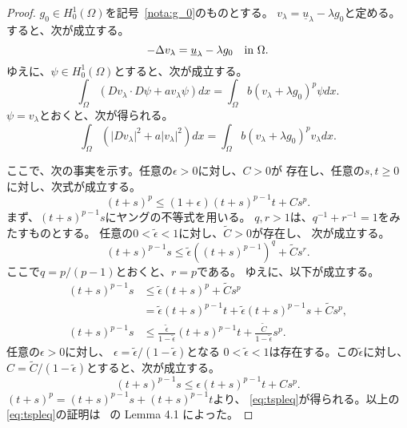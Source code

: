 \begin{proof}
 $g_0 \in H_0^1(\Omega)$を記号~\ref{nota:g_0}のものとする。
 $v_\lambda = \underline{u}_\lambda - \lambda g_0$と定める。
 すると、次が成立する。
 \[
  -\Delta v_\lambda = \underline{u}_\lambda - \lambda g_0 \ \ ~\text{in}~ \Omega.
 \]
 ゆえに、$\psi \in H_0^1(\Omega)$とすると、次が成立する。
 \[
  \int_\Omega (Dv_\lambda \cdot D\psi + a v_\lambda \psi) dx =
 \int_\Omega b(v_\lambda + \lambda g_0)^p \psi dx.
 \]
 $\psi = v_\lambda$とおくと、次が得られる。
 \begin{equation}
  \int_\Omega \left( \lvert Dv_\lambda \rvert^2 + a \lvert v_\lambda
               \rvert^2 \right) dx =
  \int_\Omega b(v_\lambda + \lambda g_0)^p v_\lambda dx. \label{eq:v_lambda}
 \end{equation}

 ここで、次の事実を示す。任意の$\epsilon > 0$に対し、$C > 0$が
 存在し、任意の$s, t \geq 0$に対し、次式が成立する。
 \begin{equation}
  (t+s)^p \leq (1 + \epsilon) (t+s)^{p-1} t + C s^p. \label{eq:tspleq}
 \end{equation}
 まず、$(t+s)^{p-1}s$にヤングの不等式を用いる。
 $q, r > 1$は、$q^{-1} + r^{-1} = 1$をみたすものとする。
 任意の$0 < \tilde{\epsilon} < 1$に対し、$\tilde{C} > 0$が存在し、
 次が成立する。
 \[
  (t+s)^{p-1} s \leq \tilde{\epsilon} \left( (t+s)^{p-1} \right)^q +
 \tilde{C} s^r.
 \]
 ここで$q = p/(p-1)$とおくと、$r = p$である。
 ゆえに、以下が成立する。
 \begin{align*}
  (t+s)^{p-1} s & \leq \tilde{\epsilon} (t+s)^p + \tilde{C} s^p \\
  &= \tilde{\epsilon} (t+s)^{p-1} t + \tilde{\epsilon} (t+s)^{p-1} s 
  + \tilde{C} s^p, \\
  (t+s)^{p-1} s &\leq \frac{\tilde{\epsilon}}{1 - \tilde{\epsilon}}
  (t+s)^{p-1} t + \frac{\tilde{C}}{1 - \tilde{\epsilon}} s^p.
 \end{align*}
 任意の$\epsilon > 0$に対し、
 $\epsilon = \tilde{\epsilon} / (1 - \tilde{\epsilon})$となる
 $0 < \tilde{\epsilon} < 1$は存在する。この$\tilde{\epsilon}$に対し、
 $C = \tilde{C}/ (1 - \tilde{\epsilon})$とすると、次が成立する。
 \[
  (t+s)^{p-1} s \leq \epsilon (t+s)^{p-1} t + Cs^p.
 \]
 $(t+s)^{p} = (t+s)^{p-1} s + (t+s)^{p-1}t$より、
 \eqref{eq:tspleq}が得られる。以上の\eqref{eq:tspleq}の証明は
 \cite{MR2317491}~の Lemma 4.1 によった。


\end{proof}
